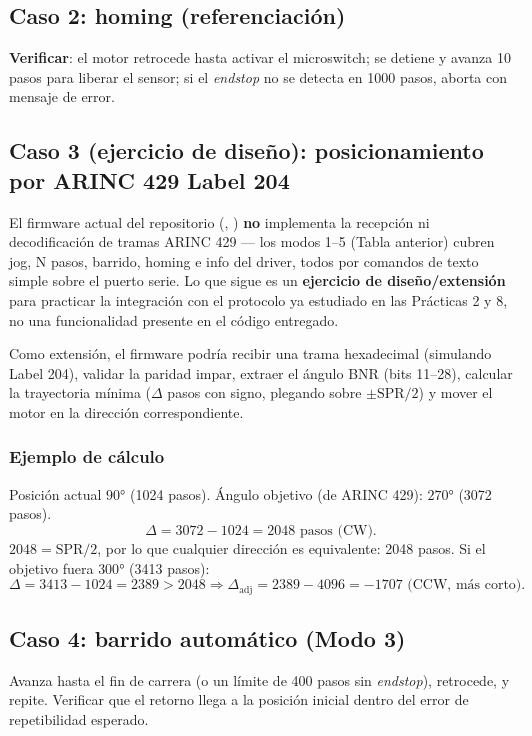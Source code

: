 \documentclass[11pt]{article}
\begin{document}
\subsection{Caso 2: homing (referenciación)}
\textbf{Verificar}: el motor retrocede hasta activar el microswitch; se detiene y avanza
10 pasos para liberar el sensor; si el \emph{endstop} no se detecta en 1000 pasos, aborta
con mensaje de error.

\subsection{Caso 3 (ejercicio de diseño): posicionamiento por ARINC 429 Label 204}
\begin{nota}
El firmware actual del repositorio (, ) \textbf{no}
implementa la recepción ni decodificación de tramas ARINC 429 — los modos 1--5
(Tabla anterior) cubren jog, N pasos, barrido, homing e info del driver, todos por
comandos de texto simple sobre el puerto serie. Lo que sigue es un
\textbf{ejercicio de diseño/extensión} para practicar la integración con el
protocolo ya estudiado en las Prácticas 2 y 8, no una funcionalidad presente en el
código entregado.
\end{nota}
Como extensión, el firmware podría recibir una trama hexadecimal (simulando Label 204),
validar la paridad impar, extraer el ángulo BNR (bits 11--28), calcular la trayectoria
mínima ($\Delta$ pasos con signo, plegando sobre $\pm\text{SPR}/2$) y mover el motor en
la dirección correspondiente.

\subsubsection{Ejemplo de cálculo}
Posición actual $90\si{\degree}$ (1024 pasos). Ángulo objetivo (de ARINC 429):
$270\si{\degree}$ (3072 pasos).
$$\Delta = 3072-1024 = 2048 \text{ pasos (CW)}.$$
$2048=\text{SPR}/2$, por lo que cualquier dirección es equivalente: 2048 pasos. Si el
objetivo fuera $300\si{\degree}$ (3413 pasos):
$$\Delta = 3413-1024=2389 > 2048 \Rightarrow \Delta_\text{adj}=2389-4096=-1707
\text{ (CCW, más corto)}.$$

\subsection{Caso 4: barrido automático (Modo 3)}
Avanza hasta el fin de carrera (o un límite de 400 pasos sin \emph{endstop}), retrocede,
y repite. Verificar que el retorno llega a la posición inicial dentro del error de
repetibilidad esperado.
\end{document}
